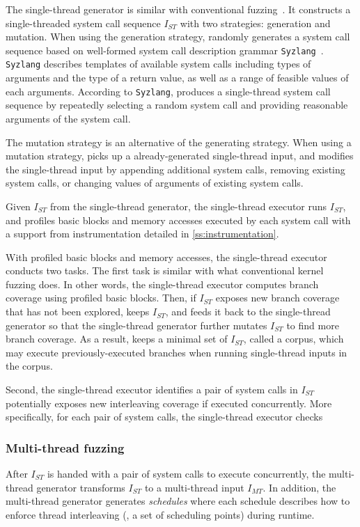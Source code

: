 %
The single-thread generator is similar with conventional
fuzzing~\cite{syzkaller}.
%
It constructs a single-threaded system call sequence $I_{ST}$ with two
strategies: generation and mutation.
%
When using the generation strategy, \sys randomly generates a system
call sequence based on well-formed system call description grammar
\texttt{Syzlang}~\cite{syzlang}.
%
\texttt{Syzlang} describes templates of available system calls
including types of arguments and the type of a return value, as well
as a range of feasible values of each arguments.
%
According to \texttt{Syzlang}, \sys produces a single-thread system
call sequence by repeatedly selecting a random system call and
providing reasonable arguments of the system call.

The mutation strategy is an alternative of the generating strategy.
When using a mutation strategy, \sys picks up a already-generated
single-thread input, and modifies the single-thread input by appending
additional system calls, removing existing system calls, or changing
values of arguments of existing system calls.


%
Given $I_{ST}$ from the single-thread generator, the single-thread
executor runs $I_{ST}$, and profiles basic blocks and memory accesses
executed by each system call with a support from instrumentation
detailed in \autoref{ss:instrumentation}.

With profiled basic blocks and memory accesses, the single-thread
executor conducts two tasks.
%
The first task is similar with what conventional kernel fuzzing
does.
%
In other words, the single-thread executor computes branch coverage
using profiled basic blocks.
%
Then, if $I_{ST}$ exposes new branch coverage that has not been
explored, \sys keeps $I_{ST}$, and feeds it back to the single-thread
generator so that the single-thread generator further mutates $I_{ST}$
to find more branch coverage.
%
As a result, \sys keeps a minimal set of $I_{ST}$, called a corpus,
which may execute previously-executed branches when running
single-thread inputs in the corpus.


Second, the single-thread executor identifies a pair of system calls
in $I_{ST}$ potentially exposes new interleaving coverage if executed
concurrently.
%
More specifically, for each pair of system calls, the single-thread
executor checks  \dr{}
%



\subsubsection{Multi-thread fuzzing}
%
After $I_{ST}$ is handed with a pair of system calls to execute
concurrently, the multi-thread generator transforms $I_{ST}$ to a
multi-thread input $I_{MT}$.
%
In addition, the multi-thread generator generates \textit{schedules}
where each schedule describes how to enforce thread interleaving (\ie,
a set of scheduling points) during runtime.


